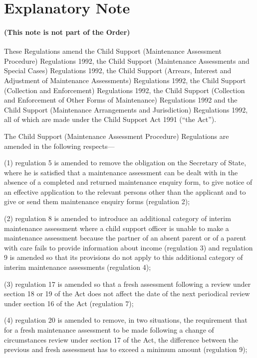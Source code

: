 \documentclass[a4paper]{article}
\newcommand{\parthead}{}
\begin{document}
\part{Explanatory Note}

\renewcommand\parthead{--- Explanatory Note}

\subsection*{(This note is not part of the Order)}

 These Regulations amend the Child Support (Maintenance Assessment Procedure) Regulations 1992, the Child Support (Maintenance Assessments and Special Cases) Regulations 1992, the Child Support (Arrears, Interest and Adjustment of Maintenance Assessments) Regulations 1992, the Child Support (Collection and Enforcement) Regulations 1992, the Child Support (Collection and Enforcement of Other Forms of Maintenance) Regulations 1992 and the Child Support (Maintenance Arrangements and Jurisdiction) Regulations 1992, all of which are made under the Child Support Act 1991 (“the Act”).

 The Child Support (Maintenance Assessment Procedure) Regulations are amended in the following respects---

 (1) regulation 5 is amended to remove the obligation on the Secretary of State, where he is satisfied that a maintenance assessment can be dealt with in the absence of a completed and returned maintenance enquiry form, to give notice of an effective application to the relevant persons other than the applicant and to give or send them maintenance enquiry forms (regulation 2);

 (2) regulation 8 is amended to introduce an additional category of interim maintenance assessment where a child support officer is unable to make a maintenance assessment because the partner of an absent parent or of a parent with care fails to provide information about income (regulation 3) and regulation 9 is amended so that its provisions do not apply to this additional category of interim maintenance assessments (regulation 4);

 (3) regulation 17 is amended so that a fresh assessment following a review under section 18 or 19 of the Act does not affect the date of the next periodical review under section 16 of the Act (regulation 7);

 (4) regulation 20 is amended to remove, in two situations, the requirement that for a fresh maintenance assessment to be made following a change of circumstances review under section 17 of the Act, the difference between the previous and fresh assessment has to exceed a minimum amount (regulation 9);
\end{document}
